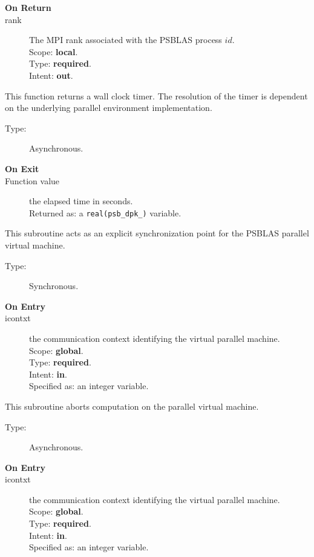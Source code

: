 \begin{description}
\item[\bf On Return]
\item[rank] The MPI rank associated with the  PSBLAS process $id$.\\
Scope: {\bf local}.\\
Type: {\bf required}.\\
Intent: {\bf out}.\\
\end{description}






This function returns a wall clock timer. The resolution of the timer
is dependent on the underlying parallel environment implementation.
\begin{description}
\item[Type:] Asynchronous.
\item[\bf  On Exit ]
\item[Function value] the elapsed time in seconds.\\
Returned  as: a  \verb|real(psb_dpk_)|  variable.
\end{description}




This subroutine acts as an explicit synchronization point for  the  PSBLAS
parallel virtual  machine. 
\begin{description}
\item[Type:] Synchronous.
\item[\bf  On Entry ]
\item[icontxt] the communication context identifying the virtual
  parallel machine.\\
Scope: {\bf global}.\\
Type: {\bf required}.\\
Intent: {\bf in}.\\
Specified as: an integer variable.
\end{description}




This subroutine aborts computation on the parallel virtual machine. 
\begin{description}
\item[Type:] Asynchronous.
\item[\bf  On Entry ]
\item[icontxt] the communication context identifying the virtual
  parallel machine.\\
Scope: {\bf global}.\\
Type: {\bf required}.\\
Intent: {\bf in}.\\
Specified as: an integer variable.
\end{description}





